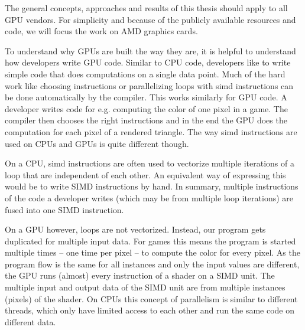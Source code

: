 The general concepts, approaches and results of this thesis should apply to all GPU vendors. For simplicity and because of the publicly available resources and code, we will focus the work on AMD graphics cards.

To understand why GPUs are built the way they are, it is helpful to understand how developers write GPU code. Similar to CPU code, developers like to write simple code that does computations on a single data point. Much of the hard work like choosing instructions or parallelizing loops with \gls{simd} instructions can be done automatically by the compiler. This works similarly for GPU code. A developer writes code for e.g. computing the color of one pixel in a game. The compiler then chooses the right instructions and in the end the GPU does the computation for each pixel of a rendered triangle. The way \gls{simd} instructions are used on CPUs and GPUs is quite different though.

On a CPU, \gls{simd} instructions are often used to vectorize multiple iterations of a loop that are independent of each other. An equivalent way of expressing this would be to write SIMD instructions by hand. In summary, multiple instructions of the code a developer writes (which may be from multiple loop iterations) are fused into one SIMD instruction.

On a GPU however, loops are not vectorized. Instead, our program gets duplicated for multiple input data. For games this means the program is started multiple times -- one time per pixel -- to compute the color for every pixel. As the program flow is the same for all instances and only the input values are different, the GPU runs (almost) every instruction of a shader on a SIMD unit. The multiple input and output data of the SIMD unit are from multiple instances (pixels) of the shader. On CPUs this concept of parallelism is similar to different threads, which only have limited access to each other and run the same code on different data.

